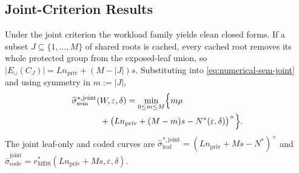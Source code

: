 \documentclass[journal]{IEEEtran}
\numberwithin{equation}{section}
\begin{document}
\subsection{Joint-Criterion Results}
\label{subsec:numerical-joint-results}

Under the joint criterion the workload family yields clean closed forms.  If
a subset \(J\subseteq\{1,\ldots,M\}\) of shared roots is cached, every cached
root removes its whole protected group from the exposed-leaf union, so
\(|E_{\cup}(C_J)|=Ln_{\mathrm{priv}}+(M-|J|)s\).  Substituting into
\eqref{eq:numerical-sem-joint} and using symmetry in \(m:=|J|\),
\begin{equation}
  \begin{split}
    \widehat{\sigma}_{\mathrm{sem}}^{*,\mathrm{joint}}
    ( & W,\varepsilon,\delta)
    =
    \min_{0\le m\le M}
    \Bigl\{ m\rho \\
    & + \bigl( L n_{\mathrm{priv}} + (M-m)s - N^*(\varepsilon,\delta) \bigr)^+ \Bigr\}.
  \end{split}
\label{eq:numerical-joint-sem-opt}
\end{equation}
The joint leaf-only and coded curves are
\(\widehat{\sigma}_{\mathrm{leaf}}^{*,\mathrm{joint}}
=(Ln_{\mathrm{priv}}+Ms-N^{*})^{+}\) and
\(\widehat{\bar{\sigma}}_{\mathrm{code}}^{\mathrm{joint}}
=r_{\mathrm{MDS}}^{*}(Ln_{\mathrm{priv}}+Ms,\varepsilon,\delta)\).
\end{document}
